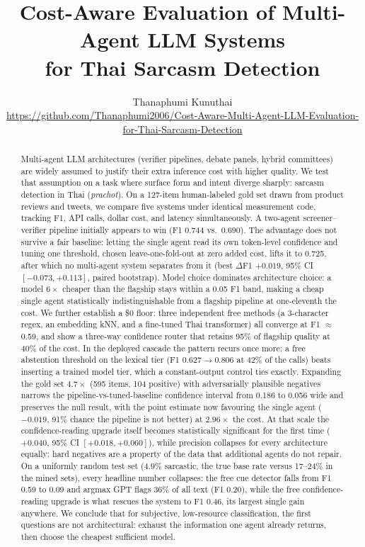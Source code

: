 \documentclass[10pt]{article}
\title{\bfseries Cost-Aware Evaluation of Multi-Agent LLM Systems\\for Thai Sarcasm Detection}
\author{Thanaphumi Kunuthai\\
\small\url{https://github.com/Thanaphumi2006/Cost-Aware-Multi-Agent-LLM-Evaluation-for-Thai-Sarcasm-Detection}}
\date{}
\begin{document}
\maketitle

\begin{abstract}
Multi-agent LLM architectures (verifier pipelines, debate panels, hybrid committees) are widely
assumed to justify their extra inference cost with higher quality. We test that assumption on a task
where surface form and intent diverge sharply: sarcasm detection in Thai (\emph{prachot}).
On a 127-item human-labeled gold set drawn from product reviews and tweets, we compare five systems
under identical measurement code, tracking F1, API calls, dollar cost, and latency simultaneously.
A two-agent screener--verifier pipeline initially appears to win (F1 0.744 vs.\ 0.690). The advantage
does not survive a fair baseline: letting the single agent read its own token-level confidence and
tuning one threshold, chosen leave-one-fold-out at zero added cost, lifts it to 0.725, after which
no multi-agent system separates from it (best $\Delta$F1 $+0.019$, 95\% CI $[-0.073, +0.113]$,
paired bootstrap). Model choice dominates architecture choice: a model $6\times$ cheaper than the
flagship stays within a 0.05 F1 band, making a cheap single agent statistically indistinguishable
from a flagship pipeline at one-eleventh the cost. We further establish a \$0 floor: three
independent free methods (a 3-character regex, an embedding kNN, and a fine-tuned Thai transformer)
all converge at F1 $\approx$ 0.59, and show a three-way confidence router that retains 95\% of
flagship quality at 40\% of the cost. In the deployed cascade the pattern recurs once more: a free
abstention threshold on the lexical tier (F1 $0.627 \to 0.806$ at 42\% of the calls) beats inserting
a trained model tier, which a constant-output control ties exactly. Expanding the gold set $4.7\times$ (595 items, 104 positive)
with adversarially plausible negatives narrows the pipeline-vs-tuned-baseline confidence interval
from 0.186 to 0.056 wide and preserves the null result, with the point estimate now favouring the
single agent ($-0.019$, 91\% chance the pipeline is not better) at $2.96\times$ the cost. At that
scale the confidence-reading upgrade itself becomes statistically significant for the first time
($+0.040$, 95\% CI $[+0.018, +0.060]$), while precision collapses for every architecture equally:
hard negatives are a property of the data that additional agents do not repair. On a uniformly random test set ($4.9\%$ sarcastic, the true base rate
versus 17--24\% in the mined sets), every headline number collapses: the free cue detector falls
from F1 0.59 to 0.09 and argmax GPT flags 36\% of all text (F1 0.20), while the free
confidence-reading upgrade is what rescues the system to F1 0.46, its largest single gain anywhere.
We conclude that for subjective, low-resource classification, the first questions are not
architectural: exhaust the information one agent already returns, then choose the cheapest sufficient
model.
\end{abstract}
\end{document}
